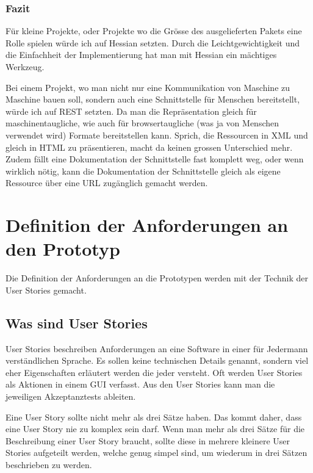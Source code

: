 \documentclass[abstracton, listof=totocnumbered,
bibliography=totocnumbered]{scrreprt}
\begin{document}
  \subsection{Fazit}
  
  Für kleine Projekte, oder Projekte wo die Grösse des ausgelieferten Pakets
  eine Rolle spielen würde ich auf Hessian setzten. Durch die
  Leichtgewichtigkeit und die Einfachheit der Implementierung hat man mit
  Hessian ein mächtiges Werkzeug.
  
  Bei einem Projekt, wo man nicht nur eine Kommunikation von Maschine zu
  Maschine bauen soll, sondern auch eine Schnittstelle für Menschen
  bereitstellt, würde ich auf \ac{REST} setzten. Da man die Repräsentation
  gleich für maschinentaugliche, wie auch für browsertaugliche (was ja von
  Menschen verwendet wird) Formate bereitstellen kann. Sprich, die Ressourcen in
  \ac{XML} und gleich in \ac{HTML} zu präsentieren, macht da keinen grossen
  Unterschied mehr. Zudem fällt eine Dokumentation der Schnittstelle fast
  komplett weg, oder wenn wirklich nötig, kann die Dokumentation der
  Schnittstelle gleich als eigene Ressource über eine \ac{URL} zugänglich
  gemacht werden.
  
  \newpage
  
  \chapter{Definition der Anforderungen an den Prototyp}
  
  Die Definition der Anforderungen an die Prototypen werden mit der Technik der
  User Sto\-ries\cite{UserStories} gemacht.
  
  \section{Was sind User Stories}
  
  User Stories beschreiben Anforderungen an eine Software in einer für Jedermann
  verständlichen Sprache. Es sollen keine technischen Details genannt, sondern
  viel eher Eigenschaften erläutert werden die jeder versteht. Oft werden User
  Stories als Aktionen in einem \ac{GUI} verfasst. Aus den User Stories kann
  man die jeweiligen Akzeptanztests\cite{AcceptanceTests} ableiten.
  
  Eine User Story sollte nicht mehr als drei Sätze haben. Das kommt daher, dass
  eine User Story nie zu komplex sein darf. Wenn man mehr als drei Sätze für die
  Beschreibung einer User Story braucht, sollte diese in mehrere kleinere User
  Stories aufgeteilt werden, welche genug simpel sind, um wiederum in drei
  Sätzen beschrieben zu werden.
  
\end{document}

